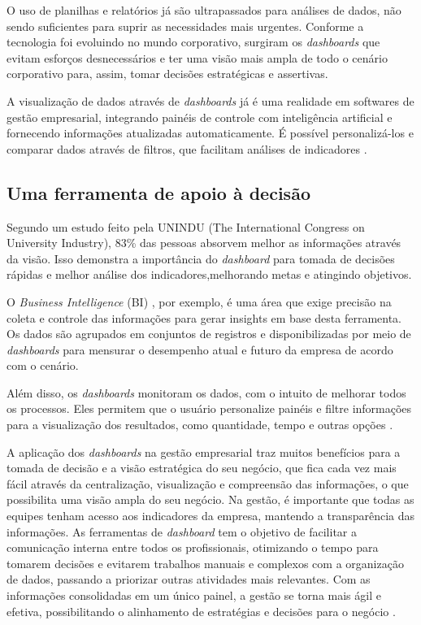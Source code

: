 \par O uso de planilhas e relatórios já são ultrapassados para análises de dados, não sendo suficientes para suprir as necessidades mais urgentes. Conforme a tecnologia foi evoluindo no mundo corporativo, surgiram os \textit{dashboards} que evitam esforços desnecessários e ter uma visão mais ampla de todo o cenário corporativo para, assim, tomar decisões estratégicas e assertivas.

\par A visualização de dados através de \textit{dashboards} já é uma realidade em softwares de gestão empresarial, integrando painéis de controle com inteligência artificial e fornecendo informações atualizadas automaticamente. É possível personalizá-los e comparar dados através de filtros, que facilitam análises de indicadores \cite{Tecnicon}.


\subsection{Uma ferramenta de apoio à decisão}

\indent
\par Segundo um estudo feito pela UNINDU (The International Congress on University Industry), 83\% das pessoas absorvem melhor as informações através da visão. Isso demonstra a importância do \textit{dashboard} para tomada de decisões rápidas e melhor análise dos indicadores,melhorando metas e atingindo objetivos.

\par O \textit{Business Intelligence} (BI) \cite{TableauBI}, por exemplo, é uma área que exige precisão na coleta e controle das informações para gerar insights em base desta ferramenta. Os dados são agrupados em conjuntos de registros e disponibilizadas por meio de \textit{dashboards} para mensurar o desempenho atual e futuro da empresa de acordo com o cenário.

\par Além disso, os \textit{dashboards} monitoram os dados, com o intuito de melhorar todos os processos. Eles permitem que o usuário personalize painéis e filtre informações para a visualização dos resultados, como quantidade, tempo e outras opções \cite{Tecnicon}.

\indent
\par A aplicação dos \textit{dashboards} na gestão empresarial traz muitos benefícios para a tomada de decisão e a visão estratégica do seu negócio, que fica cada vez mais fácil através da centralização,  visualização e compreensão das informações, o que possibilita uma visão ampla do seu negócio. Na gestão, é importante que todas as equipes tenham acesso aos indicadores da empresa, mantendo a transparência das informações. As ferramentas de \textit{dashboard} tem o objetivo de facilitar a comunicação interna entre todos os profissionais, otimizando o tempo para tomarem decisões e evitarem trabalhos manuais e complexos com a organização de dados, passando a priorizar outras atividades mais relevantes. Com as informações consolidadas em um único painel, a gestão se torna mais ágil e efetiva, possibilitando o alinhamento de estratégias e decisões para o negócio \cite{Tecnicon}.

